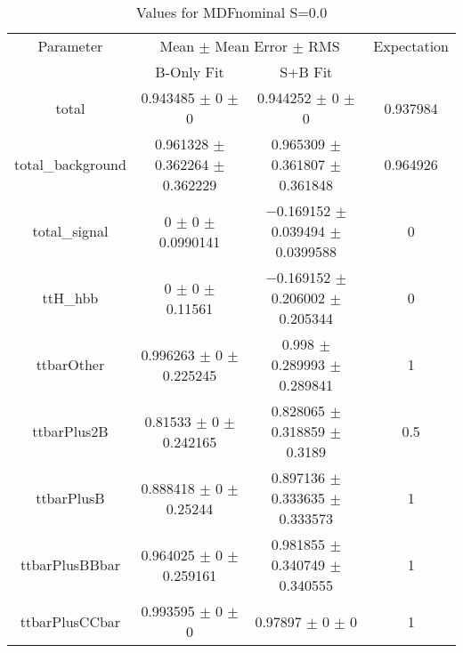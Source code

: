 \begin{table}
\centering
\caption{Values for MDFnominal S=0.0}
\begin{tabular}{cccc}
\toprule
Parameter & \multicolumn{2}{c}{Mean $\pm$ Mean Error $\pm$ RMS} & Expectation\\
 & B-Only Fit & S+B Fit & \\
\midrule
total & \num{0.943485} $\pm$ \num{0} $\pm$ \num{0} & \num{0.944252} $\pm$ \num{0} $\pm$ \num{0} & \num{0.937984}\\
total\_background & \num{0.961328} $\pm$ \num{0.362264} $\pm$ \num{0.362229} & \num{0.965309} $\pm$ \num{0.361807} $\pm$ \num{0.361848} & \num{0.964926}\\
total\_signal & \num{0} $\pm$ \num{0} $\pm$ \num{0.0990141} & \num{-0.169152} $\pm$ \num{0.039494} $\pm$ \num{0.0399588} & \num{0}\\
ttH\_hbb & \num{0} $\pm$ \num{0} $\pm$ \num{0.11561} & \num{-0.169152} $\pm$ \num{0.206002} $\pm$ \num{0.205344} & \num{0}\\
ttbarOther & \num{0.996263} $\pm$ \num{0} $\pm$ \num{0.225245} & \num{0.998} $\pm$ \num{0.289993} $\pm$ \num{0.289841} & \num{1}\\
ttbarPlus2B & \num{0.81533} $\pm$ \num{0} $\pm$ \num{0.242165} & \num{0.828065} $\pm$ \num{0.318859} $\pm$ \num{0.3189} & \num{0.5}\\
ttbarPlusB & \num{0.888418} $\pm$ \num{0} $\pm$ \num{0.25244} & \num{0.897136} $\pm$ \num{0.333635} $\pm$ \num{0.333573} & \num{1}\\
ttbarPlusBBbar & \num{0.964025} $\pm$ \num{0} $\pm$ \num{0.259161} & \num{0.981855} $\pm$ \num{0.340749} $\pm$ \num{0.340555} & \num{1}\\
ttbarPlusCCbar & \num{0.993595} $\pm$ \num{0} $\pm$ \num{0} & \num{0.97897} $\pm$ \num{0} $\pm$ \num{0} & \num{1}\\
\bottomrule
\end{tabular}
\end{table}